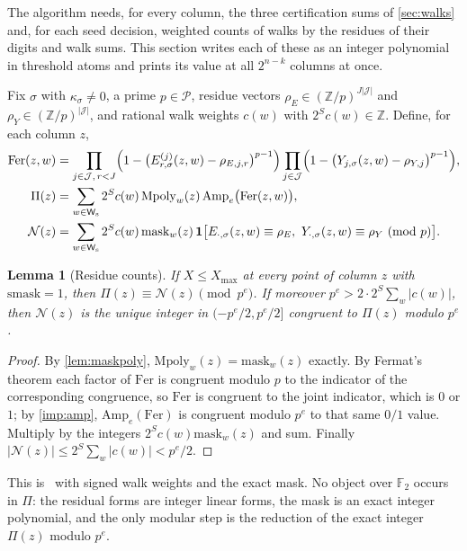 \documentclass[11pt,letterpaper]{article}
\newtheorem{lemma}[theorem]{Lemma}
\theoremstyle{definition}
\theoremstyle{remark}
\newcommand{\F}{\mathbb F}
\newcommand{\Z}{\mathbb Z}
\newcommand{\Amp}{\mathrm{Amp}}
\newcommand{\smask}{\mathrm{smask}}
\newcommand{\mask}{\mathrm{mask}}
\newcommand{\Mpoly}{\mathrm{Mpoly}}
\newcommand{\Fer}{\mathrm{Fer}}
\newcommand{\ind}{\mathbf 1}
\newcommand{\cP}{\mathcal P}
\newcommand{\cJ}{\mathcal J}
\newcommand{\Ws}{\mathsf W_{\mathrm s}}
\newcommand{\Xmax}{X_{\max}}
\begin{document}
The algorithm needs, for every column, the three certification sums
of \cref{sec:walks} and, for each seed decision, weighted counts of
walks by the residues of their digits and walk sums. This section
writes each of these as an integer polynomial in threshold atoms and
prints its value at all \(2^{n-k}\) columns at once.

Fix \(\sigma\) with \(\kappa_\sigma\ne0\), a prime \(p\in\cP\), residue
vectors \(\rho_E\in(\Z/p)^{J|\cJ|}\) and \(\rho_Y\in(\Z/p)^{|\cJ|}\), and
rational walk weights \(c(w)\) with \(2^Sc(w)\in\Z\). Define, for
each column \(z\),
\begin{align*}
 \Fer(z,w)&=\prod_{j\in\cJ,\,r<J}\Bigl(1-\bigl(E^{(j)}_{r,\sigma}(z,w)-\rho_{E,j,r}\bigr)^{p-1}\Bigr)
 \prod_{j\in\cJ}\Bigl(1-\bigl(Y_{j,\sigma}(z,w)-\rho_{Y,j}\bigr)^{p-1}\Bigr),\\
 \Pi(z)&=\sum_{w\in\Ws}2^Sc(w)\,\Mpoly_w(z)\,\Amp_e\bigl(\Fer(z,w)\bigr),\\
 \mathcal N(z)&=\sum_{w\in\Ws}2^Sc(w)\,\mask_w(z)\,
 \ind\bigl[E_{\cdot,\sigma}(z,w)\equiv\rho_E,\ Y_{\cdot,\sigma}(z,w)\equiv\rho_Y\ (\mathrm{mod}\ p)\bigr].
\end{align*}

\begin{lemma}[Residue counts]\label{lem:residue}
If \(X\le\Xmax\) at every point of column \(z\) with \(\smask=1\), then
\(\Pi(z)\equiv\mathcal N(z)\pmod{p^e}\). If moreover
\(p^e>2\cdot2^S\sum_w|c(w)|\), then \(\mathcal N(z)\) is the unique
integer in \((-p^e/2,p^e/2]\) congruent to \(\Pi(z)\) modulo \(p^e\).
\end{lemma}
\begin{proof}
By \cref{lem:maskpoly}, \(\Mpoly_w(z)=\mask_w(z)\) exactly. By
Fermat's theorem each factor of \(\Fer\) is congruent modulo \(p\) to
the indicator of the corresponding congruence, so \(\Fer\) is
congruent to the joint indicator, which is \(0\) or \(1\); by
\cref{imp:amp}, \(\Amp_e(\Fer)\) is congruent modulo \(p^e\) to that
same \(0/1\) value. Multiply by the integers \(2^Sc(w)\mask_w(z)\) and
sum. Finally \(|\mathcal N(z)|\le2^S\sum_w|c(w)|<p^e/2\).
\end{proof}

This is~\cite[Lemma~6.7]{NagCG} with signed walk weights and the exact
mask. No object over \(\F_2\) occurs in \(\Pi\): the residual forms are
integer linear forms, the mask is an exact integer polynomial, and the
only modular step is the reduction of the exact integer \(\Pi(z)\)
modulo \(p^e\).
\end{document}
